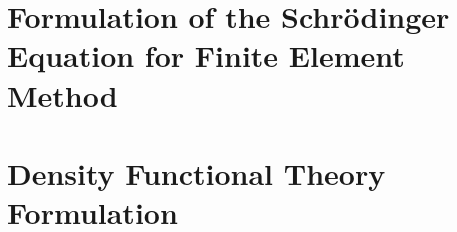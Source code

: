 \section{Formulation of the Schr\"odinger Equation for Finite Element Method}

\section{Density Functional Theory Formulation}

